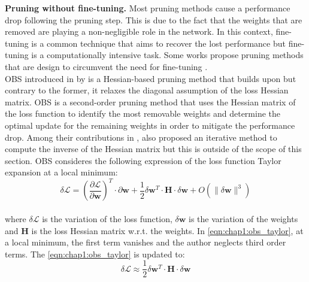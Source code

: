 \noindent\textbf{Pruning without fine-tuning.} Most pruning methods cause a
performance drop following the pruning step. This is due to the fact that the
weights that are removed are playing a non-negligible role in the network. In
this context, fine-tuning is a common technique that aims to recover the lost
performance but fine-tuning is a computationally intensive task. Some works
propose pruning methods that are design to circumvent the need for fine-tuning
\cite{DBLP:conf/nips/HassibiS92,DBLP:conf/icnn/HassibiSW93,DBLP:conf/icml/KangH20}.\\


\ac{OBS} introduced in \cite{DBLP:conf/nips/HassibiS92} by
\citeauthor{DBLP:conf/nips/HassibiS92} is a Hessian-based pruning method that builds
upon \cite{DBLP:conf/nips/CunDS89} but contrary to the former, it relaxes the
diagonal assumption of the loss Hessian matrix. \ac{OBS} is a second-order
pruning method that uses the Hessian matrix of the loss function to identify the
most removable weights and determine the optimal update for the remaining
weights in order to mitigate the performance drop. Among their contributions in
\cite{DBLP:conf/nips/HassibiS92}, \cite{DBLP:conf/nips/HassibiS92} also proposed
an iterative method to compute the inverse of the Hessian matrix but this is
outside of the scope of this section. \ac{OBS} consideres the following
expression of the loss function Taylor expansion at a local minimum:\\

\begin{equation}
  \label{eqn:chap1:obs_taylor}
  \delta \mathcal{L} = \left( \frac{\partial \mathcal{L}}{\partial \mathbf{w}} \right)^T \cdot  \partial \mathbf{w} + \frac{1}{2} \delta \mathbf{w}^T \cdot \mathbf{H} \cdot \delta \mathbf{w} + O(\| \delta \mathbf{w}\|^3)
\end{equation}\\

\noindent where $\delta \mathcal{L}$ is the variation of the loss function,
$\delta \mathbf{w}$ is the variation of the weights and $\mathbf{H}$ is the
loss Hessian matrix w.r.t. the weights. In \cref{eqn:chap1:obs_taylor}, at a
local minimum, the first term vanishes and the author neglects third order
terms. The \cref{eqn:chap1:obs_taylor} is updated to:\\

\begin{equation}
  \label{eqn:chap1:obs_taylor_approx}
  \delta \mathcal{L} \approx \frac{1}{2} \delta \mathbf{w}^T \cdot \mathbf{H} \cdot \delta \mathbf{w} 
\end{equation}\\

